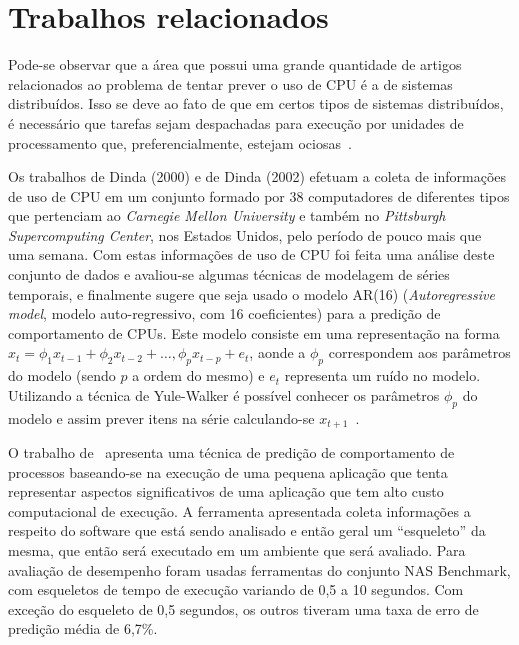 %
%

\chapter{Trabalhos relacionados}

Pode-se observar que a área que possui uma grande quantidade de artigos
relacionados ao problema de tentar prever o uso de CPU é a de sistemas
distribuídos. Isso se deve ao fato de que em certos tipos de sistemas
distribuídos, é necessário que tarefas sejam despachadas para execução por
unidades de processamento que, preferencialmente, estejam ociosas~\cite{zhang2007cpu}.

Os trabalhos de Dinda (2000)\nocite{dinda2000host} e de Dinda
(2002)\nocite{dinda2002evaluation} efetuam a coleta de informações de uso de
CPU em um conjunto formado por 38 computadores de diferentes tipos que
pertenciam ao \emph{Carnegie Mellon University} e também no \emph{Pittsburgh
Supercomputing Center}, nos Estados Unidos, pelo período de pouco mais que uma
semana. Com estas informações de uso de CPU foi feita uma análise deste conjunto
de dados e avaliou-se algumas técnicas de modelagem de séries temporais, e
finalmente sugere que seja usado o modelo AR(16) (\emph{Autoregressive model},
modelo auto-regressivo, com 16 coeficientes) para a predição de comportamento
de CPUs. Este modelo consiste em uma representação na forma
$x_t = \phi_{1}x_{t-1} + \phi_{2}x_{t-2}+\dotsc,\phi_{p}x_{t-p}+e_t$, aonde a
$\phi_p$ correspondem aos parâmetros do modelo (sendo $p$ a ordem do mesmo) e
$e_t$ representa um ruído no modelo. Utilizando a técnica de Yule-Walker é
possível conhecer os parâmetros $\phi_p$ do modelo e assim prever itens na
série calculando-se $x_{t+1}$~\cite{baddour2005autoregressive}.

O trabalho de~ apresenta uma técnica de
predição de comportamento de processos baseando-se na execução de uma pequena
aplicação que tenta representar aspectos significativos de uma aplicação que
tem alto custo computacional de execução. A ferramenta apresentada coleta
informações a respeito do software que está sendo analisado e então geral um
“esqueleto” da mesma, que então será executado em um ambiente que será
avaliado. Para avaliação de desempenho foram usadas ferramentas do conjunto NAS
Benchmark, com esqueletos de tempo de execução variando de 0,5 a 10 segundos.
Com exceção do esqueleto de 0,5 segundos, os outros tiveram uma taxa de erro de
predição média de 6,7\%. 

